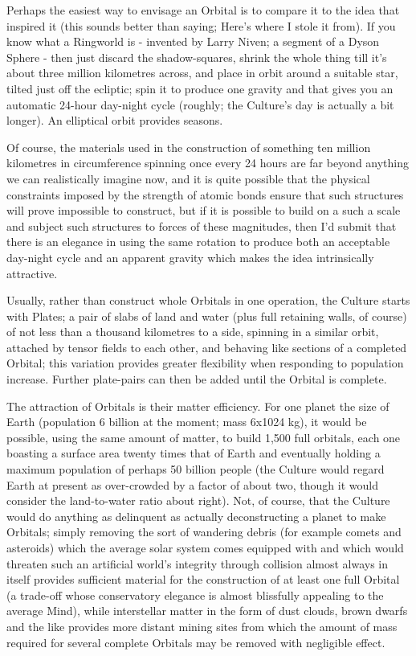 Perhaps the easiest way to envisage an Orbital is to compare it to the idea that inspired it (this sounds better than saying; Here's where I stole it from). If you know what a Ringworld is - invented by Larry Niven; a segment of a Dyson Sphere - then just discard the shadow-squares, shrink the whole thing till it's about three million kilometres across, and place in orbit around a suitable star, tilted just off the ecliptic; spin it to produce one gravity and that gives you an automatic 24-hour day-night cycle (roughly; the Culture's day is actually a bit longer). An elliptical orbit provides seasons.

Of course, the materials used in the construction of something ten million kilometres in circumference spinning once every 24 hours are far beyond anything we can realistically imagine now, and it is quite possible that the physical constraints imposed by the strength of atomic bonds ensure that such structures will prove impossible to construct, but if it is possible to build on a such a scale and subject such structures to forces of these magnitudes, then I'd submit that there is an elegance in using the same rotation to produce both an acceptable day-night cycle and an apparent gravity which makes the idea intrinsically attractive.

Usually, rather than construct whole Orbitals in one operation, the Culture starts with Plates; a pair of slabs of land and water (plus full retaining walls, of course) of not less than a thousand kilometres to a side, spinning in a similar orbit, attached by tensor fields to each other, and behaving like sections of a completed Orbital; this variation provides greater flexibility when responding to population increase. Further plate-pairs can then be added until the Orbital is complete.

The attraction of Orbitals is their matter efficiency. For one planet the size of Earth (population 6 billion at the moment; mass 6x1024 kg), it would be possible, using the same amount of matter, to build 1,500 full orbitals, each one boasting a surface area twenty times that of Earth and eventually holding a maximum population of perhaps 50 billion people (the Culture would regard Earth at present as over-crowded by a factor of about two, though it would consider the land-to-water ratio about right). Not, of course, that the Culture would do anything as delinquent as actually deconstructing a planet to make Orbitals; simply removing the sort of wandering debris (for example comets and asteroids) which the average solar system comes equipped with and which would threaten such an artificial world's integrity through collision almost always in itself provides sufficient material for the construction of at least one full Orbital (a trade-off whose conservatory elegance is almost blissfully appealing to the average Mind), while interstellar matter in the form of dust clouds, brown dwarfs and the like provides more distant mining sites from which the amount of mass required for several complete Orbitals may be removed with negligible effect.

